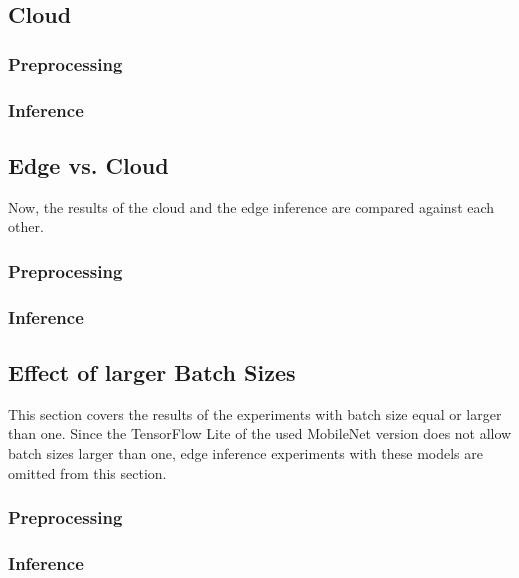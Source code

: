 \subsection{Cloud}
\subsubsection{Preprocessing}
\subsubsection{Inference}
\subsection{Edge vs. Cloud}
Now, the results of the cloud and the edge inference are compared against each other.
\subsubsection{Preprocessing}
\subsubsection{Inference}

\subsection{Effect of larger Batch Sizes}
This section covers the results of the experiments with batch size equal or larger than one. Since the TensorFlow Lite of the used MobileNet version does not allow batch sizes larger than one, edge inference experiments with these models are omitted from this section.
\subsubsection{Preprocessing}
\subsubsection{Inference}




\endinput 
